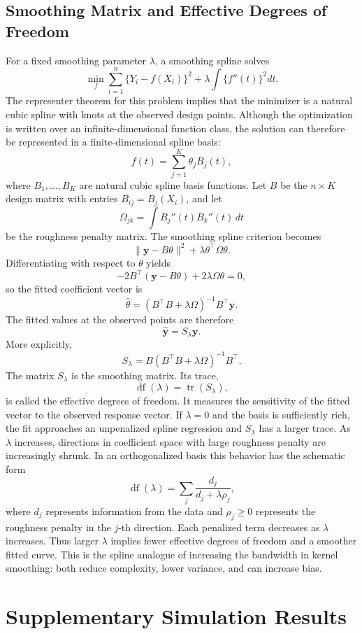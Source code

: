 \documentclass[12pt,a4paper]{article}
\begin{document}
\subsection{Smoothing Matrix and Effective Degrees of Freedom}

For a fixed smoothing parameter \(\lambda\), a smoothing spline solves
\[
\min_f
\sum_{i=1}^{n}\{Y_i-f(X_i)\}^2
+\lambda\int\{f''(t)\}^2dt.
\]
The representer theorem for this problem implies that the minimizer is a natural cubic spline with knots at the observed design points. Although the optimization is written over an infinite-dimensional function class, the solution can therefore be represented in a finite-dimensional spline basis:
\[
f(t)=\sum_{j=1}^{K}\theta_jB_j(t),
\]
where \(B_1,\ldots,B_K\) are natural cubic spline basis functions. Let \(B\) be the \(n\times K\) design matrix with entries \(B_{ij}=B_j(X_i)\), and let
\[
\Omega_{jk}=\int B_j''(t)B_k''(t)\,dt
\]
be the roughness penalty matrix. The smoothing spline criterion becomes
\[
\|\mathbf y-B\theta\|^2+\lambda\theta^\top\Omega\theta.
\]
Differentiating with respect to \(\theta\) yields
\[
-2B^\top(\mathbf y-B\theta)+2\lambda\Omega\theta=0,
\]
so the fitted coefficient vector is
\[
\hat\theta=(B^\top B+\lambda\Omega)^{-1}B^\top\mathbf y.
\]
The fitted values at the observed points are therefore
\[
\hat{\mathbf y}=S_\lambda\mathbf y.
\]
More explicitly,
\[
S_\lambda
=B(B^\top B+\lambda\Omega)^{-1}B^\top .
\]
The matrix \(S_\lambda\) is the smoothing matrix. Its trace,
\[
\operatorname{df}(\lambda)=\operatorname{tr}(S_\lambda),
\]
is called the effective degrees of freedom. It measures the sensitivity of the fitted vector to the observed response vector. If \(\lambda=0\) and the basis is sufficiently rich, the fit approaches an unpenalized spline regression and \(S_\lambda\) has a larger trace. As \(\lambda\) increases, directions in coefficient space with large roughness penalty are increasingly shrunk. In an orthogonalized basis this behavior has the schematic form
\[
\operatorname{df}(\lambda)
=\sum_j \frac{d_j}{d_j+\lambda\rho_j},
\]
where \(d_j\) represents information from the data and \(\rho_j\ge0\) represents the roughness penalty in the \(j\)-th direction. Each penalized term decreases as \(\lambda\) increases. Thus larger \(\lambda\) implies fewer effective degrees of freedom and a smoother fitted curve. This is the spline analogue of increasing the bandwidth in kernel smoothing: both reduce complexity, lower variance, and can increase bias.

\section{Supplementary Simulation Results}
\end{document}
